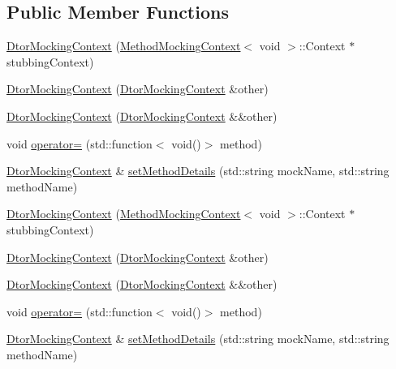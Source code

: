 \subsection*{Public Member Functions}
\begin{DoxyCompactItemize}
\item 
\mbox{\hyperlink{classfakeit_1_1DtorMockingContext_a81c785463a44f396c4c3e5e0e1c9e40d}{Dtor\+Mocking\+Context}} (\mbox{\hyperlink{classfakeit_1_1MethodMockingContext}{Method\+Mocking\+Context}}$<$ void $>$\+::Context $\ast$stubbing\+Context)
\item 
\mbox{\hyperlink{classfakeit_1_1DtorMockingContext_a03939798c9836d082d94fe4e84d3dcd3}{Dtor\+Mocking\+Context}} (\mbox{\hyperlink{classfakeit_1_1DtorMockingContext}{Dtor\+Mocking\+Context}} \&other)
\item 
\mbox{\hyperlink{classfakeit_1_1DtorMockingContext_a0cf507524171b8ab2884f269a8a62a60}{Dtor\+Mocking\+Context}} (\mbox{\hyperlink{classfakeit_1_1DtorMockingContext}{Dtor\+Mocking\+Context}} \&\&other)
\item 
void \mbox{\hyperlink{classfakeit_1_1DtorMockingContext_ac65118e0817e56484fb2238d6c1b3f46}{operator=}} (std\+::function$<$ void()$>$ method)
\item 
\mbox{\hyperlink{classfakeit_1_1DtorMockingContext}{Dtor\+Mocking\+Context}} \& \mbox{\hyperlink{classfakeit_1_1DtorMockingContext_ac2e3a23d87a1f48613dd5bf73f457309}{set\+Method\+Details}} (std\+::string mock\+Name, std\+::string method\+Name)
\item 
\mbox{\hyperlink{classfakeit_1_1DtorMockingContext_a81c785463a44f396c4c3e5e0e1c9e40d}{Dtor\+Mocking\+Context}} (\mbox{\hyperlink{classfakeit_1_1MethodMockingContext}{Method\+Mocking\+Context}}$<$ void $>$\+::Context $\ast$stubbing\+Context)
\item 
\mbox{\hyperlink{classfakeit_1_1DtorMockingContext_a03939798c9836d082d94fe4e84d3dcd3}{Dtor\+Mocking\+Context}} (\mbox{\hyperlink{classfakeit_1_1DtorMockingContext}{Dtor\+Mocking\+Context}} \&other)
\item 
\mbox{\hyperlink{classfakeit_1_1DtorMockingContext_a0cf507524171b8ab2884f269a8a62a60}{Dtor\+Mocking\+Context}} (\mbox{\hyperlink{classfakeit_1_1DtorMockingContext}{Dtor\+Mocking\+Context}} \&\&other)
\item 
void \mbox{\hyperlink{classfakeit_1_1DtorMockingContext_ac65118e0817e56484fb2238d6c1b3f46}{operator=}} (std\+::function$<$ void()$>$ method)
\item 
\mbox{\hyperlink{classfakeit_1_1DtorMockingContext}{Dtor\+Mocking\+Context}} \& \mbox{\hyperlink{classfakeit_1_1DtorMockingContext_ac2e3a23d87a1f48613dd5bf73f457309}{set\+Method\+Details}} (std\+::string mock\+Name, std\+::string method\+Name)

\end{DoxyCompactItemize}
